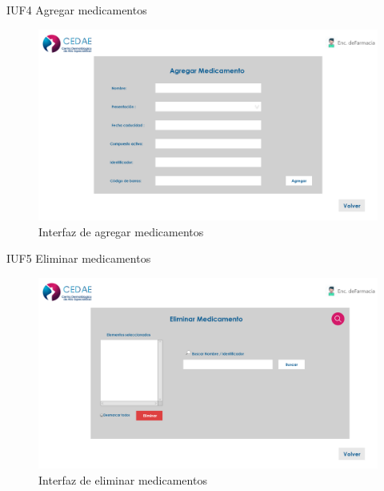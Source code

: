 \documentclass[12pt,letterpaper]{article}
\begin{document}
        IUF4 Agregar medicamentos
            \begin{figure}[H]
                \centering
                \includegraphics [scale=0.2]{interfaces/far_add_medicamento}
                \caption{Interfaz de agregar medicamentos}
            \end{figure}
        IUF5 Eliminar medicamentos
            \begin{figure}[H]
                \centering
                \includegraphics [scale=0.2]{interfaces/far_delete_medicamento}
                \caption{Interfaz de eliminar medicamentos}
            \end{figure}
        
\end{document}
